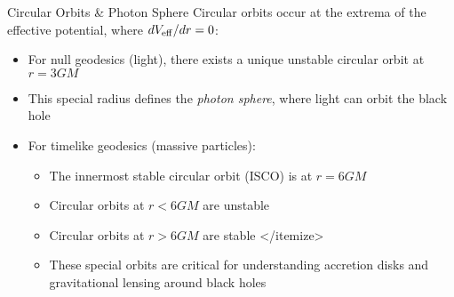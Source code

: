 \documentclass{beamer}
\begin{document}
\begin{frame}{Circular Orbits \& Photon Sphere}
  Circular orbits occur at the extrema of the effective potential, where $dV_{\rm eff}/dr=0$:
  \begin{itemize}[<+->]
    \item For null geodesics (light), there exists a unique unstable circular orbit at $r=3GM$
    \item This special radius defines the \emph{photon sphere}, where light can orbit the black hole
    \item For timelike geodesics (massive particles):
      \begin{itemize}
        \item The innermost stable circular orbit (ISCO) is at $r=6GM$
        \item Circular orbits at $r<6GM$ are unstable
        \item Circular orbits at $r>6GM$ are stable
      </itemize>
    \item These special orbits are critical for understanding accretion disks and gravitational lensing around black holes
  \end{itemize}
\end{itemize}
\end{frame}
\end{document}
